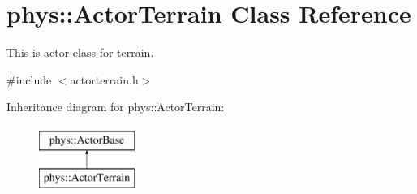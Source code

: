 \hypertarget{classphys_1_1ActorTerrain}{
\section{phys::ActorTerrain Class Reference}
\label{de/d74/classphys_1_1ActorTerrain}
}


This is actor class for terrain.  




{\ttfamily \#include $<$actorterrain.h$>$}

Inheritance diagram for phys::ActorTerrain:\begin{figure}[H]
\begin{center}
\leavevmode
\includegraphics[height=2.000000cm]{de/d74/classphys_1_1ActorTerrain}
\end{center}
\end{figure}
